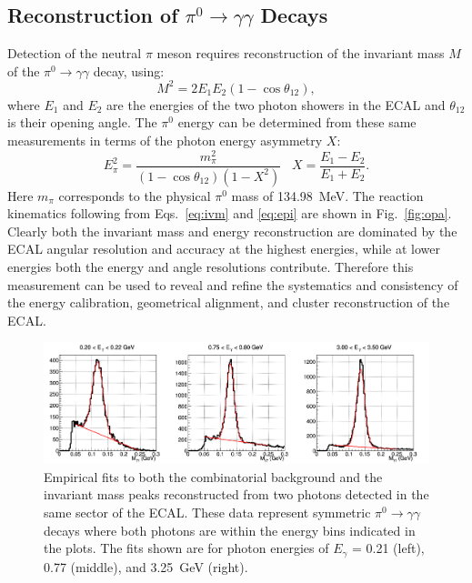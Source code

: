 \subsection{Reconstruction of $\pi^0 \to \gamma \gamma$ Decays}

Detection of the neutral $\pi$ meson requires reconstruction of the invariant mass $M$ of the
$\pi^0 \to \gamma \gamma$ decay, using:
\begin{equation}
M^2 = 2 E_1 E_2 (1-\cos \theta_{12}),
\label{eq:ivm}
\end{equation}
where $E_1$ and $E_2$ are the energies of the two photon showers in the ECAL and $\theta_{12}$ is their opening
angle. The $\pi^0$ energy can be determined from these same measurements in terms of the photon energy
asymmetry $X$:
\begin{equation}
E^2_\pi = \frac{m^2_\pi}{(1-\cos \theta_{12})(1-X^2)} \;\;\; X = \frac{E_1-E_2}{E_1+E_2}.
\label{eq:epi}
\end{equation}
Here $m_\pi$ corresponds to the physical $\pi^0$ mass of 134.98~MeV. The reaction kinematics following from
Eqs.~\ref{eq:ivm} and \ref{eq:epi} are shown in Fig.~\ref{fig:opa}. Clearly both the invariant mass and energy
reconstruction are dominated by the ECAL angular resolution and accuracy at the highest energies, while at lower
energies both the energy and angle resolutions contribute. Therefore this measurement can be used to reveal and
refine the systematics and consistency of the energy calibration, geometrical alignment, and cluster reconstruction
of the ECAL.

\begin{figure}[h]
\centering
\includegraphics[width=1.0\columnwidth,keepaspectratio]{img/fx-pi0-fits.png}
\caption[]{Empirical fits to both the combinatorial background and the invariant mass peaks reconstructed from
  two photons detected in the same sector of the ECAL. These data represent symmetric
  $\pi^0 \to \gamma \gamma$ decays where both photons are within the energy bins indicated in the plots. The
  fits shown are for photon energies of $E_\gamma$ = 0.21 (left), 0.77 (middle), and 3.25~GeV (right).}
\label{fig:fx-pi0-fits}
\end{figure}

